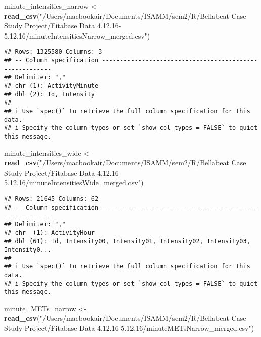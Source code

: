 \documentclass[
]{article}
\newenvironment{Shaded}{\begin{snugshade}}{\end{snugshade}}
\newcommand{\FunctionTok}[1]{\textcolor[rgb]{0.13,0.29,0.53}{\textbf{#1}}}
\newcommand{\NormalTok}[1]{#1}
\newcommand{\OtherTok}[1]{\textcolor[rgb]{0.56,0.35,0.01}{#1}}
\newcommand{\StringTok}[1]{\textcolor[rgb]{0.31,0.60,0.02}{#1}}
\begin{document}
\begin{Shaded}
\begin{Highlighting}[]
\NormalTok{minute\_intensities\_narrow }\OtherTok{\textless{}{-}} \FunctionTok{read\_csv}\NormalTok{(}\StringTok{"/Users/macbookair/Documents/ISAMM/sem2/R/Bellabeat Case Study Project/Fitabase Data 4.12.16{-}5.12.16/minuteIntensitiesNarrow\_merged.csv"}\NormalTok{)}
\end{Highlighting}
\end{Shaded}

\begin{verbatim}
## Rows: 1325580 Columns: 3
## -- Column specification --------------------------------------------------------
## Delimiter: ","
## chr (1): ActivityMinute
## dbl (2): Id, Intensity
## 
## i Use `spec()` to retrieve the full column specification for this data.
## i Specify the column types or set `show_col_types = FALSE` to quiet this message.
\end{verbatim}

\begin{Shaded}
\begin{Highlighting}[]
\NormalTok{minute\_intensities\_wide }\OtherTok{\textless{}{-}} \FunctionTok{read\_csv}\NormalTok{(}\StringTok{"/Users/macbookair/Documents/ISAMM/sem2/R/Bellabeat Case Study Project/Fitabase Data 4.12.16{-}5.12.16/minuteIntensitiesWide\_merged.csv"}\NormalTok{)}
\end{Highlighting}
\end{Shaded}

\begin{verbatim}
## Rows: 21645 Columns: 62
## -- Column specification --------------------------------------------------------
## Delimiter: ","
## chr  (1): ActivityHour
## dbl (61): Id, Intensity00, Intensity01, Intensity02, Intensity03, Intensity0...
## 
## i Use `spec()` to retrieve the full column specification for this data.
## i Specify the column types or set `show_col_types = FALSE` to quiet this message.
\end{verbatim}

\begin{Shaded}
\begin{Highlighting}[]
\NormalTok{minute\_METs\_narrow }\OtherTok{\textless{}{-}} \FunctionTok{read\_csv}\NormalTok{(}\StringTok{"/Users/macbookair/Documents/ISAMM/sem2/R/Bellabeat Case Study Project/Fitabase Data 4.12.16{-}5.12.16/minuteMETsNarrow\_merged.csv"}\NormalTok{)}
\end{Highlighting}
\end{Shaded}
\end{document}
